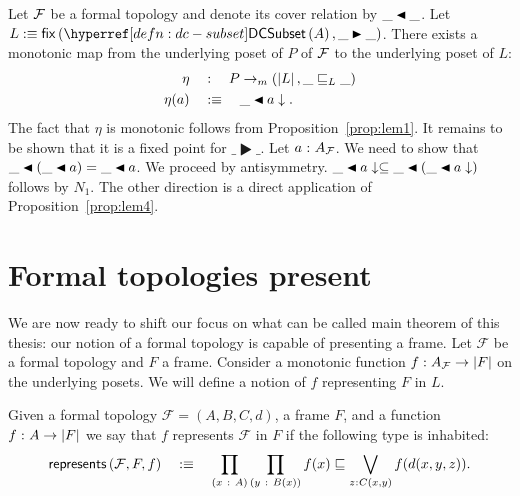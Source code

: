 \begin{defn}[$\eta$]
  Let $\mathcal{F}{}$ be a formal topology and denote its cover relation by $\covers{\_}{\_}$.
  Let $L \is \fix{\dcsubset{A}}{\_\RHD\_}$. There exists a monotonic map from the
  underlying poset of $P$ of $\mathcal{F}{}$ to the underlying poset of $L$:
  \begin{align*}
    \eta    \quad&:\quad P \rightarrow_m (\abs{L}, \_\sqsubseteq_L\_)\\
    \eta(a) \quad&\is\quad \covers{\_}{a\downarrow}.
  \end{align*}
  The fact that $\eta$ is monotonic follows from Proposition~\ref{prop:lem1}. It remains to
  be shown that it is a fixed point for $\_\RHD\_$. Let $a\hspace{0.1mm}:\hspace{0.1mm}A_{\mathcal{F}{}}$. We need
  to show that $\covers{\_}{(\covers{\_}{a})} = \covers{\_}{a}$. We proceed by
  antisymmetry. $\covers{\_}{a\downarrow} \subseteq \covers{\_}{(\covers{\_}{a\downarrow})}$ follows by $N_1$. The
  other direction is a direct application of Proposition~\ref{prop:lem4}.
\end{defn}

\section{Formal topologies present}

 We are now ready to shift our focus on what can be
called main theorem of this thesis: our notion of a formal topology is capable of
presenting a frame. Let $\mathcal{F}$ be a formal topology and $F$ a frame. Consider a
monotonic function $f : A_{\mathcal{F}} \rightarrow \left| F \right|$ on the underlying posets. We will
define a notion of $f$ representing $F$ in $L$.

\begin{defn}[Representation]\label{defn:rep}
  Given a formal topology $\mathcal{F} = (A, B, C, d)$, a frame $F$, and a function
  $f\hspace{0.1mm}:\hspace{0.1mm}A \rightarrow \left| F \right|$ we say that $f$ represents $\mathcal{F}$ in $F$ if the
  following type is inhabited:
  \begin{equation*}
    \mathsf{represents}\left(\mathcal{F}, F, f\right) \quad\is\quad
      \pity{x}{A}{
        \pity{y}{B(x)}{
          f(x) \sqsubseteq \bigvee_{\oftyI{z}{C(x, y)}} f(d(x, y, z)).
        }
      }
  \end{equation*}
\end{defn}

